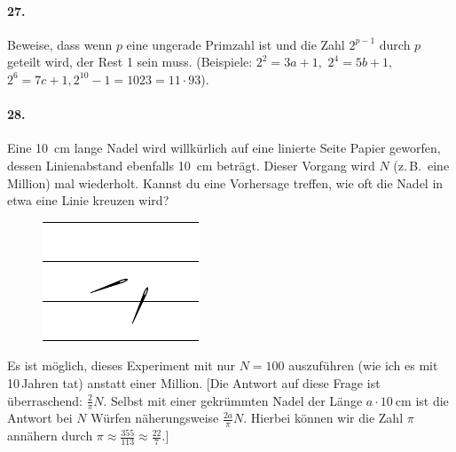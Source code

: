 \documentclass[10pt,a5paper,twoside]{article}
\newenvironment{problem}[1]{\paragraph*{#1}}{}
\begin{document}
\begin{problem}{27.}
	Beweise, dass wenn $p$ eine ungerade Primzahl ist und die Zahl $2^{p-1}$ durch $p$ geteilt wird, der Rest 1 sein muss. (Beispiele: $2^2 = 3a +1,$ $2^4 = 5b+1,$ $2^6 = 7c+1, 2^{10} - 1 = 1023 = 11\cdot 93$). 
\end{problem}

\begin{problem}{28.}
	Eine \SI{10}{\cm} lange Nadel wird willkürlich auf eine linierte Seite Papier geworfen, dessen Linienabstand ebenfalls \SI{10}{\cm} beträgt. Dieser Vorgang wird $N$ (z.\,B.\ eine Million) mal wiederholt. 
	Kannst du eine Vorhersage treffen, wie oft die Nadel in etwa eine Linie kreuzen wird?
	\begin{figure}[H]
	\centering
	\footnotesize
	\includegraphics[scale=1]{taskbook-12}
	\end{figure}
	Es ist möglich, dieses Experiment mit nur $N=100$ auszuführen (wie ich es mit 10\,Jahren tat) anstatt einer Million. [Die Antwort auf diese Frage ist überraschend: $\frac2{\pi}N$. Selbst mit einer gekrümmten Nadel der Länge $a \cdot \SI{10}{\cm}$ ist die Antwort bei $N$ Würfen näherungsweise $\frac{2a}{\pi}N$. 
	Hierbei können wir die Zahl $\pi$ annähern durch $\pi \approx \frac{355}{113} \approx \frac{22}7.$]
\end{problem}
\end{document}
